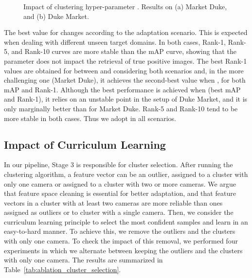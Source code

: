 \documentclass[journal]{IEEEtran}
\begin{document}
\begin{figure}[ht]
\centering
{}
\hfil
{}
\caption{Impact of clustering hyper-parameter . Results on (a) Market  Duke, and (b) Duke  Market.}
\label{fig:ablation_study_xi}
\end{figure}

The best value for  changes according to the adaptation scenario. This is expected when dealing with different unseen target domains. In both cases, Rank-1, Rank-5, and Rank-10 curves are more stable than the mAP curve, showing that the parameter does not impact the retrieval of true positive images. The best Rank-1 values are obtained for  between  and  considering both scenarios and, in the more challenging one (Market  Duke), it achieves the second-best value when , for both mAP and Rank-1. Although the best performance is achieved when  (best mAP and Rank-1), it relies on an unstable point in the setup of Duke  Market, and it is only marginally better than  for Market  Duke. Rank-5 and Rank-10 tend to be more stable in both cases. Thus we adopt  in all scenarios.

\subsection{Impact of Curriculum Learning}

In our pipeline, Stage 3 is responsible for cluster selection. After running the clustering algorithm, a feature vector can be an outlier, assigned to a cluster with only one camera or assigned to a cluster with two or more cameras. We argue that feature space cleaning is essential for better adaptation, and that feature vectors in a cluster with at least two cameras are more reliable than ones assigned as outliers or to cluster with a single camera. Then, we consider the curriculum learning principle to select the most confident samples and learn in an easy-to-hard manner. To achieve this, we remove the outliers and the clusters with only one camera. To check the impact of this removal, we performed four experiments in which we alternate between keeping the outliers and the clusters with only one camera. The results are summarized in Table~\ref{tab:ablation_cluster_selection}.
\end{document}
